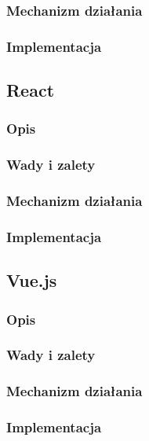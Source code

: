 \documentclass[polish, twoside, 12pt]{mwart}
\begin{document}
\subsubsection{Mechanizm działania}

\subsubsection{Implementacja}

\subsection{React}

\subsubsection{Opis}

\subsubsection{Wady i zalety}

\subsubsection{Mechanizm działania}

\subsubsection{Implementacja}

\subsection{Vue.js}

\subsubsection{Opis}

\subsubsection{Wady i zalety}

\subsubsection{Mechanizm działania}

\subsubsection{Implementacja}
\end{document}
